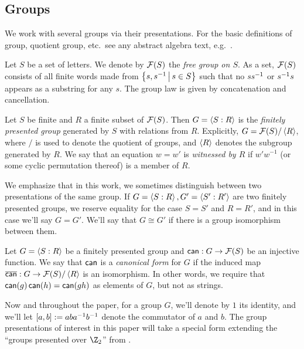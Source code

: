 \subsection{Groups}

We work with several groups via their presentations. For the basic definitions of group, quotient group, etc.\ see any abstract algebra text, e.g.\ \cite{dummit2004abstract}.
\begin{definition}
	Let $S$ be a set of letters. We denote by $\mathcal F(S)$ the \emph{free group on $S$}. As a set, $\mathcal F(S)$ consists of all finite words made from $\left\{s,s^{-1}\,\middle\vert\,s\in S\right\}$ such that no $ss^{-1}$ or $s^{-1}s$ appears as a substring for any $s$. The group law is given by concatenation and cancellation.
\end{definition}


\begin{definition}
	Let $S$ be finite and $R$ a finite subset of $\mathcal F(S)$. Then $G = \Braket {S:R}$ is the \emph{finitely presented group} generated by $S$ with relations from $R$. Explicitly, 
	$G = \mathcal F(S)/\braket R$, where $/$ is used to denote the quotient of groups, and $\braket R$ denotes the subgroup generated by $R$. 
	We say that an equation $w = w'$ is \emph{witnessed by $R$} if $w'w^{-1}$ (or some cyclic permutation thereof) is a member of $R$. 
\end{definition}
We emphasize that in this work, we sometimes distinguish between two presentations of the same group. If $G = \braket{S:R}, G' = \braket{S':R'}$ are two finitely presented groups, we reserve equality for the case $S = S'$ and $R = R'$, and in this case we'll say $G = G'$. We'll say that $G \cong G'$ if there is a group isomorphism between them.


\begin{definition}\label{definition:canonical-form}
	Let $G = \braket{S:R}$ be a finitely presented group and $\operatorname*{\mathsf{can}}: G\to \mathcal F(S)$ be an injective function. We say that $\operatorname*{\mathsf{can}}$ is a \emph{canonical form} for $G$ if the induced map $\overline{\operatorname*{\mathsf{can}}}: G\to \mathcal F(S)/\braket{R}$ is an isomorphism. In other words, we require that $\operatorname*{\mathsf{can}}(g)\operatorname*{\mathsf{can}}(h) = \operatorname*{\mathsf{can}}(gh)$ as elements of $G$, but not as strings.
\end{definition}

Now and throughout the paper, for a group $G$, we'll denote by $1$ its identity, and we'll let $[a,b] := aba^{-1}b^{-1}$ denote the commutator of $a$ and $b$. The group presentations of interest in this paper will take a special form extending the ``groups presented over $\Z_2$'' from \cite{slofstra2016tsirelson}. %


